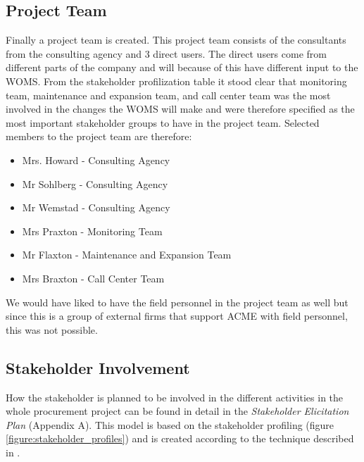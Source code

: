 \documentclass[a4paper]{article}
\begin{document}
\subsection{Project Team}
\label{sub:project_team}
Finally a project team is created. This project team consists of the consultants from the consulting agency and 3 direct users. The direct users come from different parts of the company and will because of this have different input to the WOMS. From the stakeholder profilization table it stood clear that monitoring team, maintenance and expansion team, and call center team was the most involved in the changes the WOMS will make and were therefore specified as the most important stakeholder groups to have in the project team. Selected members to the project team are therefore:
\begin{itemize}
\item Mrs. Howard		- Consulting Agency
\item Mr Sohlberg	- Consulting Agency
\item Mr Wemstad	- Consulting Agency
\item Mrs Praxton		- Monitoring Team
\item Mr Flaxton		- Maintenance and Expansion Team
\item Mrs Braxton		- Call Center Team
\end{itemize}


We would have liked to have the field personnel in the project team as well but since this is a group of  external firms that support ACME with field personnel, this was not possible.

\subsection{Stakeholder Involvement}
\label{stakeholder_involvment}
How the stakeholder is planned to be involved in the different activities in the whole procurement project can be found in detail in the \emph{Stakeholder Elicitation Plan} (Appendix A). This model is based on the stakeholder profiling (figure \ref{figure:stakeholder_profiles}) and is created according to the technique described in \cite{gott3}.
\end{document}
